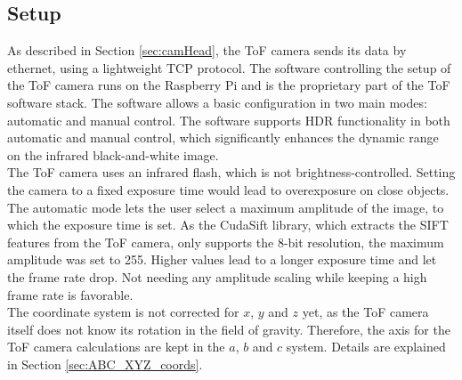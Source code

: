 \subsection{Setup}
As described in Section \ref{sec:camHead}, the ToF camera sends its data by ethernet, using a lightweight TCP protocol. The software controlling the setup of the ToF camera runs on the Raspberry Pi and is the proprietary part of the ToF software stack. The software allows a basic configuration in two main modes: automatic and manual control. The software supports HDR functionality in both automatic and manual control, which significantly enhances the dynamic range on the infrared black-and-white image.\\ 
The ToF camera uses an infrared flash, which is not brightness-controlled. Setting the camera to a fixed exposure time would lead to overexposure on close objects. The automatic mode lets the user select a maximum amplitude of the image, to which the exposure time is set. As the CudaSift library, which extracts the SIFT features from the ToF camera, only supports the 8-bit resolution, the maximum amplitude was set to 255. Higher values lead to a longer exposure time and let the frame rate drop. Not needing any amplitude scaling while keeping a high frame rate is favorable.\\
The coordinate system is not corrected for $x$, $y$ and $z$ yet, as the ToF camera itself does not know its rotation in the field of gravity. Therefore, the axis for the ToF camera calculations are kept in the $a$, $b$ and $c$ system. Details are explained in Section \ref{sec:ABC_XYZ_coords}.
